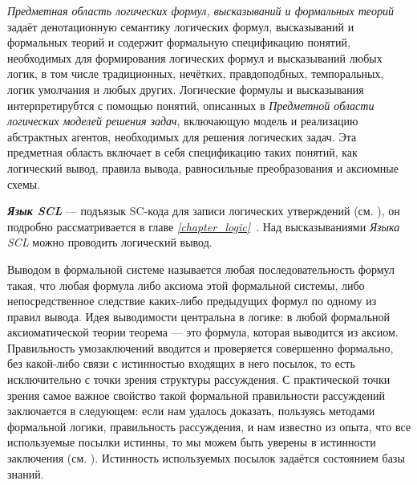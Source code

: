 \textit{Предметная область логических формул, высказываний и формальных теорий} задаёт денотационную семантику логических формул, высказываний и формальных теорий и содержит формальную спецификацию понятий, необходимых для формирования логических формул и высказываний любых логик, в том числе традиционных, нечётких, правдоподбных, темпоральных, логик умолчания и любых других. Логические формулы и высказывания интерпретирубтся с помощью понятий, описанных в \textit{Предметной области логических моделей решения задач}, включающую модель и реализацию абстрактных агентов, необходимых для решения логических задач. Эта предметная область включает в себя спецификацию таких понятий, как логический вывод, правила вывода, равносильные преобразования и аксиомные схемы.

\textit{\textbf{Язык SCL}} — подъязык SC-кода для записи логических утверждений (см. ), он подробно рассматривается в главе \textit{\ref{chapter_logic}~}. Над высказываниями \textit{Языка SCL} можно проводить логический вывод.

Выводом в формальной системе называется любая последовательность формул такая, что любая формула либо аксиома этой формальной системы, либо непосредственное следствие каких-либо предыдущих формул по одному из правил вывода. Идея выводимости центральна в логике: в любой формальной аксиоматической теории теорема --- это формула, которая выводится из аксиом. Правильность умозаключений вводится и проверяется совершенно формально, без какой-либо связи с истинностью входящих в него посылок, то есть исключительно с точки зрения структуры рассуждения. С практической точки зрения самое важное свойство такой формальной правильности рассуждений заключается в следующем: если нам удалось доказать, пользуясь методами формальной логики, правильность рассуждения, и нам известно из опыта, что все используемые посылки истинны, то мы можем быть уверены в истинности заключения (см. ). Истинность используемых посылок задаётся состоянием базы знаний.

